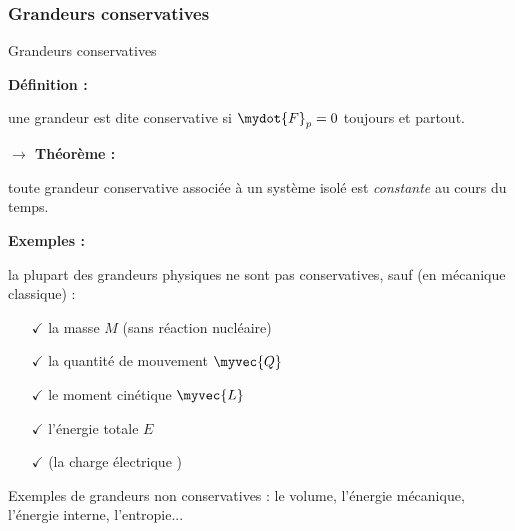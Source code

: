 \subsubsection{Grandeurs conservatives}
\begin{frame}{Grandeurs conservatives}

\small

\textbf{Définition :}

\medskip

une grandeur est dite \textcolor{vert}{conservative} si $\mydot{F}_p=0$ toujours et partout.


\bigskip 
\pause

\textbf{$\rightarrow$ Théorème :} \medskip

toute grandeur \textcolor{vert}{conservative} associée à un système  \textcolor{vert}{isolé} est \textsl{constante} au cours du temps. 

\bigskip
\pause

\textbf{Exemples :} \medskip

la plupart des grandeurs physiques ne sont pas conservatives, sauf (en mécanique classique) :

\pause

\medskip

\hspace*{5mm}
\begin{minipage}{100mm}
\begin{itemize}[<+-| alert@+>]
\item[$\checkmark$]
	la masse $M$ (sans réaction nucléaire) %
\item[$\checkmark$]
	la quantité de mouvement $\myvec{Q}$ %
\item[$\checkmark$]
	le moment cinétique $\myvec{L}$ %
\item[$\checkmark$]
	l'énergie totale $E$ %
\item[$\checkmark$]
	(la charge électrique )
\end{itemize}
\end{minipage}

\pause 
\medskip

Exemples de grandeurs non conservatives : le volume, l'énergie mécanique, l'énergie interne, l'entropie...

\vspace{0mm}
	
\end{frame}


